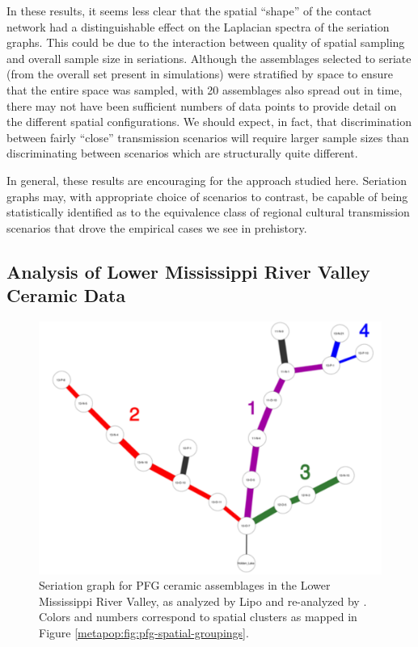     In these results, it seems less clear that the spatial ``shape'' of the contact network had a distinguishable effect on the  Laplacian spectra of the seriation graphs.  This could be due to the interaction between quality of spatial sampling and overall sample size in seriations.  Although the assemblages selected to seriate (from the overall set present in simulations) were stratified by space to ensure that the entire space was sampled, with 20 assemblages also spread out in time, there may not have been sufficient numbers of data points to provide detail on the different spatial configurations.  We should expect, in fact, that discrimination between fairly ``close'' transmission scenarios will require larger sample sizes than discriminating between scenarios which are structurally quite different.  
    
    
    In general, these results are encouraging for the approach studied here.  Seriation graphs may, with appropriate choice of scenarios to contrast, be capable of being statistically identified as to the equivalence class of regional cultural transmission scenarios that drove the empirical cases we see in prehistory. 
    
    \subsection{Analysis of Lower Mississippi River Valley Ceramic Data}\label{metapop:sec:results-lmv}
    
    \begin{figure}[ht]
    \centering
    \includegraphics[scale=0.5]{graphics/multipleseriation/pfg-seriation-graph-minmax.pdf}
    \caption{Seriation graph for PFG \citeyearpar{PFG1951} ceramic assemblages in 
    the Lower Mississippi River Valley, as analyzed by Lipo \citeyearpar{Lipo2001a} and re-analyzed by \citet{Lipo2015}. Colors and numbers correspond to spatial clusters as mapped in Figure \ref{metapop:fig:pfg-spatial-groupings}.}
    \label{metapop:fig:pfg-seriation-graphs}
    \end{figure}
    
